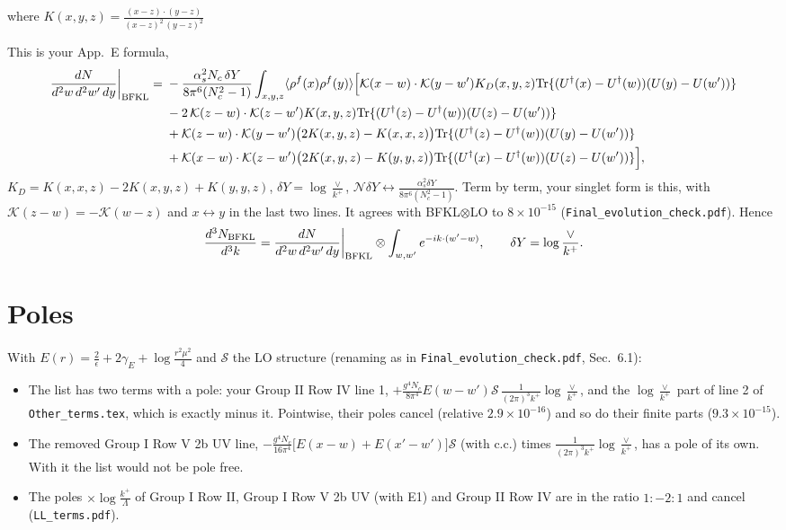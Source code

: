 \documentclass[10pt]{article}
\numberwithin{equation}{section}
\begin{document}
where $K(x,y,z) = \frac{(x-z)\cdot (y-z)}{(x-z)^{2}\, (y-z)^{2}}$

This is your App.~E formula,
\begin{align}
\frac{dN}{d^2w\,d^2w'\,dy}\bigg|_{\rm BFKL}={}&-\frac{\alpha_s^2N_c\,\delta Y}{8\pi^6(N_c^2-1)}\int_{x,y,z}\langle\rho^f(x)\rho^f(y)\rangle\Big[
\mathcal K(x-w)\cdot\mathcal K(y-w')K_D(x,y,z){\rm Tr}\{(U^\dagger(x)-U^\dagger(w))(U(y)-U(w'))\}\notag\\
&-2\,\mathcal K(z-w)\cdot\mathcal K(z-w')K(x,y,z){\rm Tr}\{(U^\dagger(z)-U^\dagger(w))(U(z)-U(w'))\}\notag\\
&+\mathcal K(z-w)\cdot\mathcal K(y-w')\big(2K(x,y,z)-K(x,x,z)\big){\rm Tr}\{(U^\dagger(z)-U^\dagger(w))(U(y)-U(w'))\}\notag\\
&+\mathcal K(x-w)\cdot\mathcal K(z-w')\big(2K(x,y,z)-K(y,y,z)\big){\rm Tr}\{(U^\dagger(x)-U^\dagger(w))(U(z)-U(w'))\}\Big],
\label{eq:BFKLapp}
\end{align}
$K_D=K(x,x,z)-2K(x,y,z)+K(y,y,z)$, $\delta Y=\log\frac{\vee}{k^+}$, $\mathcal N\delta Y\leftrightarrow\frac{\alpha_s^2\delta Y}{8\pi^6(N_c^2-1)}$. Term by term, your singlet form is this, with $\mathcal K(z-w)=-\mathcal K(w-z)$ and $x\leftrightarrow y$ in the last two lines. It agrees with BFKL$\otimes$LO to $8\times10^{-15}$ (\texttt{Final\_evolution\_check.pdf}). Hence
\begin{equation}
\frac{d^3N_{\rm BFKL}}{d^3k}=\frac{dN}{d^2w\,d^2w'\,dy}\bigg|_{\rm BFKL}\otimes\int_{w,w'}e^{-ik\cdot(w'-w)},\qquad \delta Y=\log\frac{\vee}{k^+}.
\label{eq:BFKLfinal}
\end{equation}

\section{Poles}\label{sec:pole}
With $E(r)=\frac{2}{\epsilon}+2\gamma_E+\log\frac{r^2\mu^2}{4}$ and $\mathcal S$ the LO structure (renaming as in \texttt{Final\_evolution\_check.pdf}, Sec.~6.1):
\begin{itemize}
\item The list has two terms with a pole: your Group II Row IV line 1, $+\frac{g^4N_c}{8\pi^4}E(w-w')\mathcal S\,\frac{1}{(2\pi)^3k^+}\log\frac{\vee}{k^+}$, and the $\log\frac{\vee}{k^+}$ part of line 2 of \texttt{Other\_terms.tex}, which is exactly minus it. Pointwise, their poles cancel (relative $2.9\times10^{-16}$) and so do their finite parts ($9.3\times10^{-15}$).
\item The removed Group I Row V 2b UV line, $-\frac{g^4N_c}{16\pi^4}\big[E(x-w)+E(x'-w')\big]\mathcal S$ (with c.c.) times $\frac{1}{(2\pi)^3k^+}\log\frac{\vee}{k^+}$, has a pole of its own. With it the list would not be pole free.
\item The poles $\times\log\frac{k^+}{\Lambda}$ of Group I Row II, Group I Row V 2b UV (with E1) and Group II Row IV are in the ratio $1:-2:1$ and cancel (\texttt{LL\_terms.pdf}).
\end{itemize}
\end{document}
